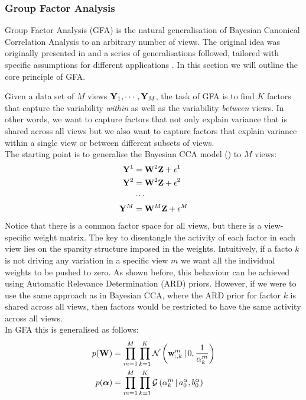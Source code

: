\subsubsection{Group Factor Analysis} \label{section:gfa}

Group Factor Analysis (GFA) is the natural generalisation of Bayesian Canonical Correlation Analysis to an arbitrary number of views.
The original idea was originally presented in \cite{Virtanen2012} and a series of generalisations followed, tailored with specific assumptions for different applications \cite{Klami2015,Leppaaho2017,Bunte2016,Khan2014,Zhao2016,Remes2015}. In this section we will outline the core principle of GFA.

Given a data set of $M$ views ${\bf Y}_1, \cdots, {\bf Y}_M$, the task of GFA is to find $K$ factors that capture the variability \textit{within} as well as the variability \textit{between} views. In other words, we want to capture factors that not only explain variance that is shared across all views but we also want to capture factors that explain variance within a single view or between different subsets of views.\\
The starting point is to generalise the Bayesian CCA model () to $M$ views:
\begin{align*}
	{\bf Y}^{1} &= {\bf W}^{2} {\bf Z} + \epsilon^{1} \\
	{\bf Y}^{2} &= {\bf W}^{2} {\bf Z} + \epsilon^{2} \\
	& \cdots \\
	{\bf Y}^{M} &= {\bf W}^{M} {\bf Z} + \epsilon^{M}
\end{align*}
Notice that there is a common factor space for all views, but there is a view-specific weight matrix. The key to disentangle the activity of each factor in each view lies on the sparsity structure imposed in the weights. Intuitively, if a facto $k$ is not driving any variation in a specific view $m$ we want all the individual weights to be pushed to zero. As shown before, this behaviour can be achieved using Automatic Relevance Determination (ARD) priors. However, if we were to use the same approach as in Bayesian CCA, where the ARD prior for factor $k$ is shared across all views, then factors would be restricted to have the same activity across all views.\\
In GFA this is generalised as follows:
\begin{align}
	p({\bf W}) &= \prod_{m=1}^{M} \prod_{k=1}^{K} \mathcal{N}\left({\bf w}_{:,k}^m \,|\, 0,\frac{1}{\alpha_k^m}\right) \\
	p(\mbox{\boldmath $\alpha$}) &= \prod_{m=1}^{M} \prod_{k=1}^{K} \mathcal{G}\left(\alpha_k^m \,|\, a_0^\alpha, b_0^\alpha\right)
\end{align}
